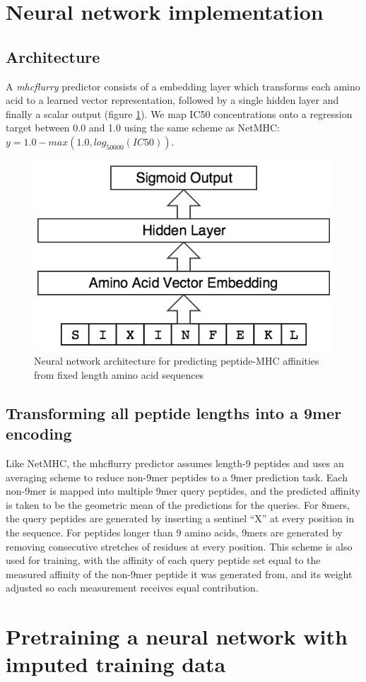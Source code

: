 \section{Neural network implementation}
\subsection{Architecture}
A {\it mhcflurry} predictor consists of a embedding layer which transforms each amino acid to a learned vector representation, followed by a single hidden layer and finally a scalar output (figure \ref{fig:architecture}). We map IC50 concentrations onto a regression target between 0.0 and 1.0 using the same scheme as NetMHC: $y = 1.0 - max(1.0, log_{50000}(IC50))$.

\begin{figure}[h]
\centering
\includegraphics[scale=0.5]{figures/mhcflurry-gliffy-network.png}
\caption{Neural network architecture for predicting peptide-MHC affinities from fixed length amino acid sequences}
\label{fig:architecture}
\end{figure}

\subsection{Transforming all peptide lengths into a 9mer encoding}
Like NetMHC\cite{lundegaard2008accurate}, the mhcflurry predictor assumes length-9 peptides and uses an averaging scheme to reduce non-9mer peptides to a 9mer prediction task. Each non-9mer is mapped into multiple 9mer query peptides, and the predicted affinity is taken to be the geometric mean of the predictions for the queries. For 8mers, the query peptides are generated by inserting a sentinel ``X'' at every position in the sequence. For peptides longer than 9 amino acids, 9mers are generated by removing consecutive stretches of residues at every position. This scheme is also used for training, with the affinity of each query peptide set equal to the measured affinity of the non-9mer peptide it was generated from, and its weight adjusted so each measurement receives equal contribution.

\section{Pretraining a neural network with imputed training data}

